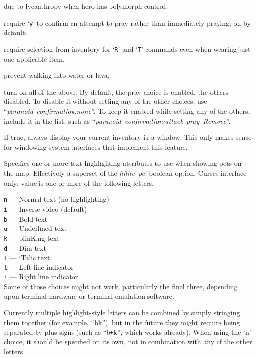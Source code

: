 due to lycanthropy
when hero has polymorph control;
\item[{\tt pray~~~}]
require `{\tt y}' to confirm an attempt to pray rather
than immediately praying; on by default;
\item[{\tt Remove~}] require selection from inventory for `{\tt R}'
and `{\tt T}'
commands even when wearing just one applicable item.
\item[{\tt swim~~~}]
prevent walking into water or lava.
\item[{\tt all~~~~}]
turn on all of the above.
\elist
By default, the pray choice is enabled, the others disabled.
To disable it without setting
any of the other choices, use ``{\it paranoid\verb+_+confirmation:none}''.  To keep
it enabled while setting any of the others, include it in the list,
such as ``{\it par\-a\-noid\verb+_+con\-fir\-ma\-tion:attack~pray~Remove}''.
\item[\ib{perm\verb+_+invent}]
If true, always display your current inventory in a window.  This only
makes sense for windowing system interfaces that implement this feature.
\item[\ib{petattr}]
Specifies one or more text highlighting attributes to use when showing
pets on the map.
Effectively a superset of the {\it hilite\verb+_+pet\/} boolean option.
Curses interface only; value is one or more of the following letters.

{\tt n} --- Normal text (no highlighting)\\
{\tt i} --- Inverse video (default)\\
{\tt b} --- Bold text\\
{\tt u} --- Underlined text\\
{\tt k} --- blinKing text\\
{\tt d} --- Dim text\\
{\tt t} --- iTalic text\\
{\tt l} --- Left line indicator\\
{\tt r} --- Right line indicator\\

Some of those choices might not work, particularly the final three,
depending upon terminal hardware or terminal emulation software.

Currently multiple highlight-style letters can be combined by simply
stringing them together (for example, ``bk''), but in the future
they might require being separated by plus signs (such as ``b\verb&+&k'',
which works already).
When using the `n' choice, it should be specified on its own,
not in combination with any of the other letters.

